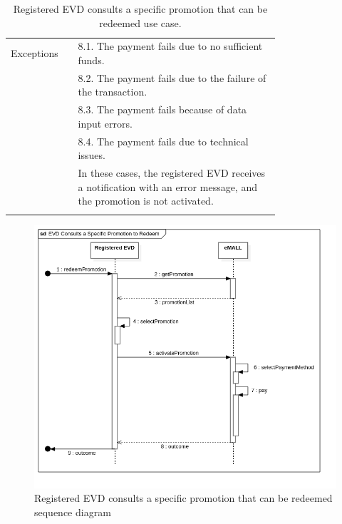 \begin{center}
\begin{longtable}{lp{0.75\linewidth}}
        \hline
        Exceptions       & 8.1. The payment fails due to no sufficient funds.                                                                    \\
        & 8.2. The payment fails due to the failure of the transaction.                                                         \\
        & 8.3. The payment fails because of data input errors.                                                                  \\
        & 8.4. The payment fails due to technical issues.                                                                       \\
        & In these cases, the registered EVD receives a notification with an error message, and the promotion is not activated. \\
        \hline
        \caption{Registered EVD consults a specific promotion that can be redeemed use case.}
        \label{tab: EVD_consults_promotion_use_case}
    \end{longtable}

    \begin{figure} [H]
        \begin{center}
            \includegraphics[width=0.9\linewidth]{Images/SequenceDiagrams/evd_consults_a_specific_promotion_to_redeem}
            \caption{Registered EVD consults a specific promotion that can be redeemed sequence diagram}
            \label{fig: evd_consults_promotion_seq_diag}
        \end{center}
    \end{figure}
\end{center}

